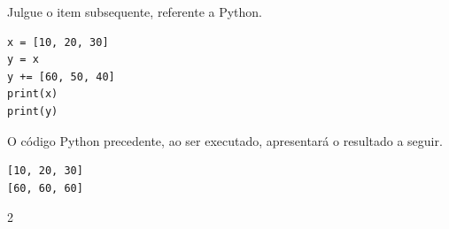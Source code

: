 
{ %
\item \rtask \ponto{\pt}
Julgue o item subsequente, referente a Python.

\begin{lstlisting}[style=Python]
x = [10, 20, 30]
y = x
y += [60, 50, 40]
print(x)
print(y)
\end{lstlisting}

O código Python precedente, ao ser executado, apresentará o resultado a seguir.

\begin{lstlisting}[style=Text]
[10, 20, 30]
[60, 60, 60]
\end{lstlisting}


{\setlength{\columnsep}{0pt}\renewcommand{\columnseprule}{0pt}
\begin{multicols}{2}
\begin{answerlist}[label={\texttt{\Alph*}.},leftmargin=*]
    \ti[V.]
    \ifnum{}\doneitem[F.]\else\ti[F.]\fi %
\end{answerlist}
\end{multicols}
}
}
